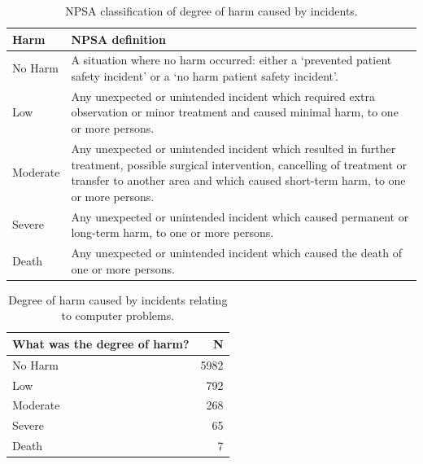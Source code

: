 \begin{table}[htbp]\centering
\begin{tabular}{l p{10cm}}
\toprule
\textbf{Harm} & \textbf{NPSA definition} \\
\midrule
No Harm & A situation where no harm occurred: either a ‘prevented patient safety incident’ or a ‘no harm patient safety incident’. \\
Low & Any unexpected or unintended incident which required extra observation or minor treatment and caused minimal harm, to one or more persons. \\
Moderate & Any unexpected or unintended incident which resulted in further treatment, possible surgical intervention, cancelling of treatment or transfer to another area and which caused short-term harm, to one or more persons. \\
Severe & Any unexpected or unintended incident which caused permanent or long-term harm, to one or more persons. \\
Death & Any unexpected or unintended incident which caused the death of one or more persons.\\
\bottomrule
\end{tabular}
\label{tab:harm1}
\caption{NPSA classification of degree of harm caused by incidents.}
\end{table}



\begin{table}[htbp]\centering
\begin{tabular}{lr}
\toprule
\textbf{What was the degree of harm?} & {\textbf{N}} \\
\midrule

No Harm & 5982 \\
Low & 792 \\
Moderate & 268 \\
Severe	& 65 \\
Death & 7 \\


\bottomrule
\end{tabular}
\label{tab:degreeharm}
\caption{Degree of harm caused by incidents relating to computer problems.}
\end{table}


